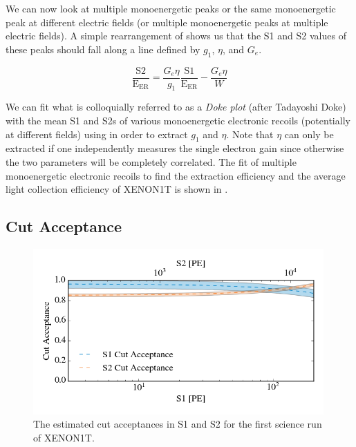 
We can now look at multiple monoenergetic peaks or the same monoenergetic peak at different electric fields (or multiple monoenergetic peaks at multiple electric fields).  A simple rearrangement of  shows us that the S1 and S2 values of these peaks should fall along a line defined by $g_1$, $\eta$, and $G_e$.

 \begin{equation}
        \label{eqn:xe1t_anticorrelation_line}
        \frac{\textrm{S2}}{\textrm{E}_{\textrm{ER}}} = \frac{G_e \eta}{g_1} \frac{\textrm{S1}}{\textrm{E}_{\textrm{ER}}} - \frac{G_e \eta}{W}
\end{equation}
 
 We can fit what is colloquially referred to as a \textit{Doke plot} (after Tadayoshi Doke) with the mean S1 and S2s of various monoenergetic electronic recoils (potentially at different fields) using  in order to extract $g_1$ and $\eta$.  Note that $\eta$ can only be extracted if one independently measures the single electron gain since otherwise the two parameters will be completely correlated.  The fit of multiple monoenergetic electronic recoils to find the extraction efficiency and the average light collection efficiency of XENON1T is shown in . 
 
 

\subsection{Cut Acceptance}
\label{sec:xe1t_cut_acceptance}

\begin{figure}[t]
	\centering
	\includegraphics[width=0.99\textwidth]{xe1t_cut_acceptances}
	\caption{The estimated cut acceptances in S1 and S2 for the first science run of XENON1T.}
	\label{fig:xe1t_cut_acceptances}
\end{figure}


